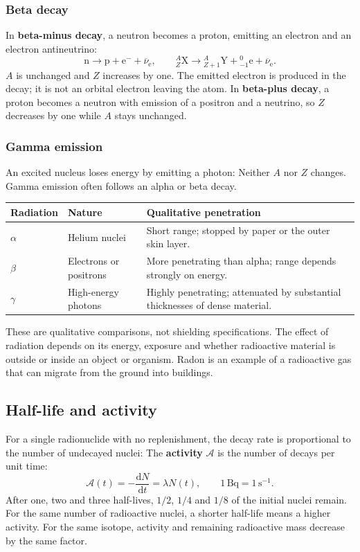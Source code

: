 \documentclass[a4paper,10pt]{article}
\newcommand{\chemunit}[1]{\,\mathrm{#1}}
\begin{document}
\subsubsection{Beta decay}
In \textbf{beta-minus decay}, a neutron becomes a proton, emitting an electron
and an electron antineutrino:
\[
 \mathrm n\longrightarrow\mathrm p+\mathrm e^-+\overline\nu_{\mathrm e},
 \qquad {}^{A}_{Z}\mathrm X\longrightarrow{}^{A}_{Z+1}\mathrm Y
 +{}^{0}_{-1}\mathrm e+\overline\nu_{\mathrm e}.
\]
$A$ is unchanged and $Z$ increases by one. The emitted electron is produced
in the decay; it is not an orbital electron leaving the atom.
In \textbf{beta-plus decay}, a proton becomes a neutron with emission of a
positron and a neutrino, so $Z$ decreases by one while $A$ stays unchanged.

\subsubsection{Gamma emission}
An excited nucleus loses energy by emitting a photon:
Neither $A$ nor $Z$ changes. Gamma emission often follows an alpha or beta decay.

\begin{tabularx}{\linewidth}{@{}lLL@{}}
\toprule
Radiation & Nature & Qualitative penetration \\
\midrule
$\alpha$ & Helium nuclei & Short range; stopped by paper or the outer skin layer. \\
$\beta$ & Electrons or positrons & More penetrating than alpha; range depends strongly on energy. \\
$\gamma$ & High-energy photons & Highly penetrating; attenuated by substantial thicknesses of dense material. \\
\bottomrule
\end{tabularx}

These are qualitative comparisons, not shielding specifications. The effect of
radiation depends on its energy, exposure and whether radioactive material is
outside or inside an object or organism. Radon is an example of a radioactive
gas that can migrate from the ground into buildings.

\subsection{Half-life and activity}
For a single radionuclide with no replenishment, the decay rate is proportional
to the number of undecayed nuclei:
The \textbf{activity} $\mathcal A$ is the number of decays per unit time:
\[
 \mathcal A(t)=-\frac{\mathrm dN}{\mathrm dt}=\lambda N(t),\qquad
 1\chemunit{Bq}=1\chemunit{s^{-1}}.
\]
After one, two and three half-lives, $1/2$, $1/4$ and $1/8$ of the initial nuclei
remain. For the same number of radioactive nuclei, a shorter half-life means
a higher activity. For the same isotope, activity and remaining radioactive
mass decrease by the same factor.
\end{document}
